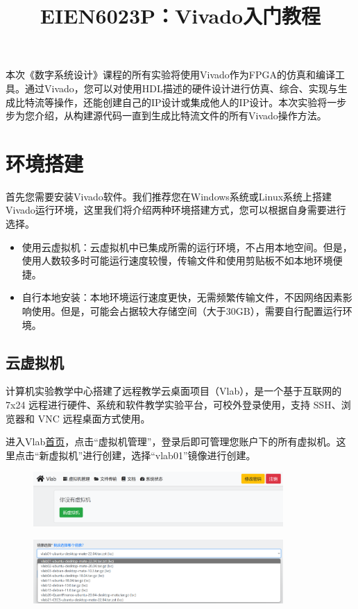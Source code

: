\documentclass{ctexart}
\title{EIEN6023P：Vivado入门教程}
\author{}
\date{}
\begin{document}
\maketitle

本次《数字系统设计》课程的所有实验将使用Vivado作为FPGA的仿真和编译工具。通过Vivado，您可以对使用HDL描述的硬件设计进行仿真、综合、实现与生成比特流等操作，还能创建自己的IP设计或集成他人的IP设计。本次实验将一步步为您介绍，从构建源代码一直到生成比特流文件的所有Vivado操作方法。


\section{环境搭建}
首先您需要安装Vivado软件。我们推荐您在Windows系统或Linux系统上搭建Vivado运行环境，这里我们将介绍两种环境搭建方式，您可以根据自身需要进行选择。
\begin{itemize}
\item 使用云虚拟机：云虚拟机中已集成所需的运行环境，不占用本地空间。但是，使用人数较多时可能运行速度较慢，传输文件和使用剪贴板不如本地环境便捷。
\item 自行本地安装：本地环境运行速度更快，无需频繁传输文件，不因网络因素影响使用。但是，可能会占据较大存储空间（大于30GB），需要自行配置运行环境。
\end{itemize}

\subsection{云虚拟机}

计算机实验教学中心搭建了远程教学云桌面项目（Vlab），是一个基于互联网的 7x24 远程进行硬件、系统和软件教学实验平台，可校外登录使用，支持 SSH、浏览器和 VNC 远程桌面方式使用。

进入Vlab\href{https://vlab.ustc.edu.cn/}{首页}，点击“虚拟机管理”，登录后即可管理您账户下的所有虚拟机。这里点击“新虚拟机”进行创建，选择“vlab01”镜像进行创建。

\begin{figure}[H]
    \centering
    \includegraphics[width=0.85\textwidth]{lab0/1.png}
\end{figure}

\begin{figure}[H]
    \centering
    \includegraphics[width=0.85\textwidth]{lab0/2.png}
\end{figure}
\end{document}
